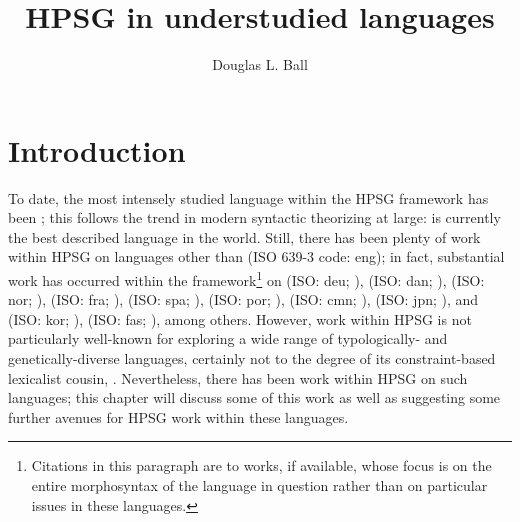 \documentclass[output=paper
 	        ,biblatex
                ,babelshorthands
                ,newtxmath
                ,draftmode
                ,colorlinks, citecolor=brown
]{langscibook}
\title{HPSG in understudied languages}
\author{%
	Douglas L. Ball\affiliation{Truman State University}%
}
\begin{document}
\maketitle
\label{understudied-languages}


\section{Introduction}

To date, the most intensely studied language within the HPSG framework has been ; this follows the trend in modern syntactic theorizing at large:  is currently the best described language in the world. Still, there has been plenty of work within HPSG on languages other than  (ISO 639-3 code: eng); in fact, substantial work has occurred within the framework\footnote{Citations in this paragraph are  to works, if available, whose focus is on the entire morphosyntax of the language in question rather than on particular issues in these languages.} on 
 (ISO: deu; \citealt{Crysmann2003b,MuellerLehrbuch3}), 
 (ISO: dan; \citealt{MOeDanish}), 
 (ISO: nor; \citealt{HH2004a-u}), 
 (ISO: fra; \citealt{AG2000a,AG2002b-u,abegod04,ABGT2006a-u}), 
 (ISO: spa; \citealt{Marimon2013a-u}), 
 (ISO: por; \citealt{CB2010a-u}), 
 (ISO: cmn; \citealt{ML2013a,YF2014a-u}), 
 (ISO: jpn; \citealt*{SBB2016a}), and 
 (ISO: kor; \citealt*{KYSB2011a-u,Kim2016a-u}),
 (ISO: fas; \citealt*{Taghvaipour2004a,Taghvaipour2005b,Taghvaipour2005a,Taghvaipour2010a-u,MuellerPersian,MG2010a,BS2009a,ST2010a-u}), 
among others. However, work within HPSG is not particularly well-known for exploring a wide range of typologically- and genetically-diverse languages, certainly not to the degree of its constraint-based lexicalist cousin, . Nevertheless, there has been work within HPSG on such languages; this chapter will discuss some of this work as well as suggesting some further avenues for HPSG work within these languages.
\end{document}
